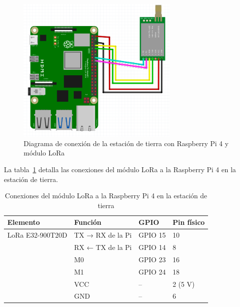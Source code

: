 \begin{figure}[H]
    \centering
    \includegraphics[width=0.7\textwidth]{Imagenes/Bitmap/conexion_ground}
    \caption{Diagrama de conexión de la estación de tierra con Raspberry Pi 4 y módulo LoRa}
    \label{fig:conexion_ground}
\end{figure}
La tabla~\ref{tab:conexiones_ground_pi4} detalla las conexiones del módulo LoRa a la Raspberry Pi 4 en la estación de tierra.

\begin{table}[H]
    \centering
    \renewcommand{\arraystretch}{1.2}
    \begin{tabular}{|l|l|l|l|}
        \hline
        \textbf{Elemento} & \textbf{Función} & \textbf{GPIO} & \textbf{Pin físico} \\ \hline
        LoRa E32-900T20D  & TX → RX de la Pi & GPIO 15       & 10                  \\ \cline{2-4}
        & RX ← TX de la Pi & GPIO 14       & 8                   \\ \cline{2-4}
        & M0               & GPIO 23       & 16                  \\ \cline{2-4}
        & M1               & GPIO 24       & 18                  \\ \cline{2-4}
        & VCC              & --            & 2 (5 V)             \\ \cline{2-4}
        & GND              & --            & 6                   \\ \hline
    \end{tabular}
    \caption{Conexiones del módulo LoRa a la Raspberry Pi 4 en la estación de tierra}
    \label{tab:conexiones_ground_pi4}
\end{table}


